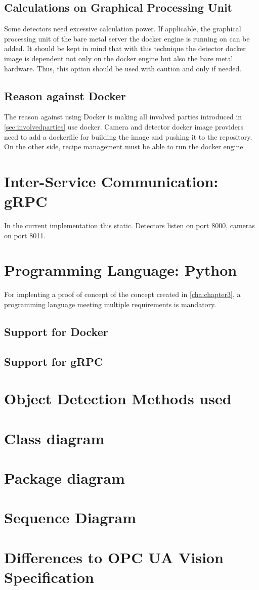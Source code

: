  \subsection{Calculations on Graphical Processing Unit}
 Some detectors need excessive calculation power. If applicable, the graphical processing unit of the bare metal server the docker engine is running on can be added. It should be kept in mind that with this technique the detector docker image is dependent not only on the docker engine but also the bare metal hardware. Thus, this option should be used with caution and only if needed.
\subsection{Reason against Docker}
The reason against using Docker is making all involved parties introduced in \ref{sec:involvedparties} use docker. Camera and detector docker image providers need to add a dockerfile for building the image and pushing it to the repository. On the other side, recipe management must be able to run the docker engine

\section{Inter-Service Communication: gRPC}
In the current implementation this static. Detectors listen on port 8000, cameras on port 8011. 
\section{Programming Language: Python}
For implenting a proof of concept of the concept created in \ref{cha:chapter3}, a programming language meeting multiple requirements is mandatory. \\

\subsection{Support for Docker}

\subsection{Support for gRPC}

\section{Object Detection Methods used}
\section{Class diagram}
\section{Package diagram}
\section{Sequence Diagram}
\section{Differences to OPC UA Vision Specification}